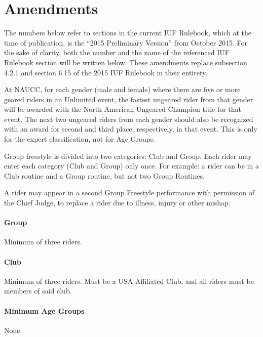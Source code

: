 \part{Amendments}
\parttoc
{}

The numbers below refer to sections in the current IUF Rulebook, which at the time of publication, is the ``2015 Preliminary Version'' from October 2015. For the sake of clarity, both the number and the name of the referenced IUF Rulebook section will be written below. These amendments replace subsection 4.2.1 and section 6.15 of the 2015 IUF Rulebook in their entirety.

At NAUCC, for each gender (male and female) where there are five or more geared riders in an Unlimited event, the fastest ungeared rider from that gender will be awarded with the North American Ungeared Champion title for that event.
The next two ungeared riders from each gender should also be recognized with an award for second and third place, respectively, in that event.
This is only for the expert classification, not for Age Groups.

\vspace{1cm}

Group freestyle is divided into two categories: Club and Group.
Each rider may enter each category (Club and Group) only once.
For example: a rider can be in a Club routine and a Group routine, but not two Group Routines.

A rider may appear in a second Group Freestyle performance with permission of the Chief Judge, to replace a rider due to illness, injury or other mishap.

\subsection{Group}
Minimum of three riders.

\subsection{Club}
Minimum of three riders. Must be a USA Affiliated Club, and all riders must be members of said club.

\subsection{Minimum Age Groups}
None.

